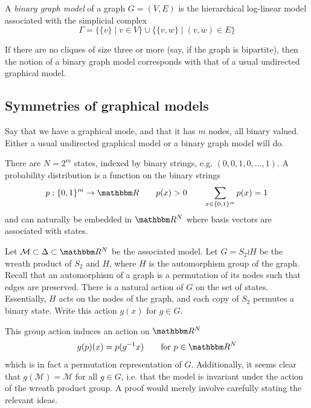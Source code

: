 \documentclass[12pt]{article}
\newcommand*{\ms}{\mathcal{M}}
\begin{document}
\begin{definition}
    A \emph{binary graph model} of a graph $G = (V, E)$ is the hierarchical log-linear
    model associated with the simplicial complex
    \[
        \Gamma = \{\{v\}\mid v \in V\} \cup \{ \{v, w\} \mid (v, w) \in E\}
    \]
\end{definition}
If there are no cliques of size three or more (say, if the graph is bipartite), then
the notion of a binary graph model corresponds with that of a usual undirected
graphical model.

\subsection{Symmetries of graphical models}
Say that we have a graphical mode, and that it has $m$ nodes, all binary valued.
Either a usual undirected graphical model or a binary graph model will do.

There are $N = 2^m$ states, indexed by binary strings, e.g. $(0, 0, 1, 0,
\ldots, 1)$.  A probability distribution is a function on the binary strings
\[
    p: \{0, 1\}^m \to \R
    \qquad
    p(x) > 0
    \qquad
    \sum_{x \in \{0, 1\}^m} p(x) = 1
\]
and can naturally be embedded in $\R^N$ where basis vectors are associated
with states.

Let $\ms \subset \Delta \subset \R^N$ be the associated model.  Let $G = S_2
\wr H$ be the wreath product of $S_2$ and $H$, where $H$ is the automorphism
group of the graph.  Recall that an automorphism of a graph is a permutation of
its nodes such that edges are preserved.  There is a natural action of $G$ on
the set of states.  Essentially, $H$ acts on the nodes of the graph, and each
copy of $S_2$ permutes a binary state.  Write this action $g(x)$ for $g \in
G$.

This group action induces an action on $\R^N$
\[
    g(p)(x) = p(\inv g x)
    \qquad
    \text{for $p \in \R^N$}
\]
which is in fact a permutation representation of $G$.  Additionally, it seems
clear that $g(\ms) = \ms$ for all $g \in G$, i.e. that the model is invariant
under the action of the wreath product group.  A proof would merely involve
carefully stating the relevant ideas.
\end{document}
